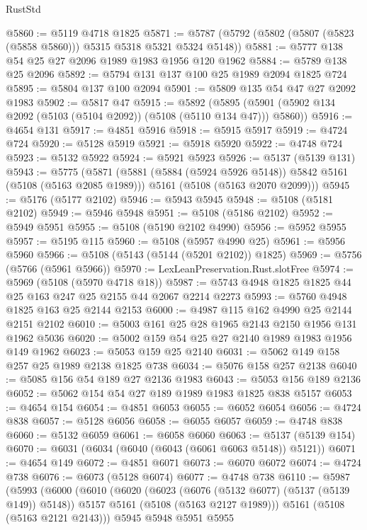 \begin{lexlean}{RustStd}
\begin{coremodule}
@5860 := @5119 @4718 @1825
@5871 := @5787 (@5792 (@5802 (@5807 (@5823 (@5858 @5860))) @5315 @5318 @5321 @5324 @5148))
@5881 := @5777 @138 @54 @25 @27 @2096 @1989 @1983 @1956 @120 @1962
@5884 := @5789 @138 @25 @2096
@5892 := @5794 @131 @137 @100 @25 @1989 @2094 @1825 @724
@5895 := @5804 @137 @100 @2094
@5901 := @5809 @135 @54 @47 @27 @2092 @1983
@5902 := @5817 @47
@5915 := @5892
    (@5895 (@5901 (@5902 @134 @2092 (@5103 (@5104 @2092)) (@5108 (@5110 @134 @47))) @5860))
@5916 := @4654 @131
@5917 := @4851 @5916
@5918 := @5915 @5917
@5919 := @4724 @724
@5920 := @5128 @5919
@5921 := @5918 @5920
@5922 := @4748 @724
@5923 := @5132 @5922
@5924 := @5921 @5923
@5926 := @5137 (@5139 @131)
@5943 := @5775
    (@5871
      (@5881 (@5884 (@5924 @5926 @5148)) @5842 @5161 (@5108 (@5163 @2085 @1989)))
      @5161
      (@5108 (@5163 @2070 @2099)))
@5945 := @5176 (@5177 @2102)
@5946 := @5943 @5945
@5948 := @5108 (@5181 @2102)
@5949 := @5946 @5948
@5951 := @5108 (@5186 @2102)
@5952 := @5949 @5951
@5955 := @5108 (@5190 @2102 @4990)
@5956 := @5952 @5955
@5957 := @5195 @115
@5960 := @5108 (@5957 @4990 @25)
@5961 := @5956 @5960
@5966 := @5108 (@5143 (@5144 (@5201 @2102)) @1825)
@5969 := @5756 (@5766 (@5961 @5966))
@5970 := LexLeanPreservation.Rust.slotFree
@5974 := @5969 (@5108 (@5970 @4718 @18))
@5987 := @5743 @4948 @1825 @1825 @44 @25 @163 @247 @25 @2155 @44 @2067 @2214 @2273
@5993 := @5760 @4948 @1825 @163 @25 @2144 @2153
@6000 := @4987 @115 @162 @4990 @25 @2144 @2151 @2102
@6010 := @5003 @161 @25 @28 @1965 @2143 @2150 @1956 @131 @1962 @5036
@6020 := @5002 @159 @54 @25 @27 @2140 @1989 @1983 @1956 @149 @1962
@6023 := @5053 @159 @25 @2140
@6031 := @5062 @149 @158 @257 @25 @1989 @2138 @1825 @738
@6034 := @5076 @158 @257 @2138
@6040 := @5085 @156 @54 @189 @27 @2136 @1983
@6043 := @5053 @156 @189 @2136
@6052 := @5062 @154 @54 @27 @189 @1989 @1983 @1825 @838 @5157
@6053 := @4654 @154
@6054 := @4851 @6053
@6055 := @6052 @6054
@6056 := @4724 @838
@6057 := @5128 @6056
@6058 := @6055 @6057
@6059 := @4748 @838
@6060 := @5132 @6059
@6061 := @6058 @6060
@6063 := @5137 (@5139 @154)
@6070 := @6031 (@6034 (@6040 (@6043 (@6061 @6063 @5148)) @5121))
@6071 := @4654 @149
@6072 := @4851 @6071
@6073 := @6070 @6072
@6074 := @4724 @738
@6076 := @6073 (@5128 @6074)
@6077 := @4748 @738
@6110 := @5987
    (@5993
      (@6000
        (@6010
          (@6020
            (@6023 (@6076 (@5132 @6077) (@5137 (@5139 @149)) @5148))
            @5157
            @5161
            (@5108 (@5163 @2127 @1989)))
          @5161
          (@5108 (@5163 @2121 @2143)))
        @5945
        @5948
        @5951
        @5955

\end{coremodule}
\end{lexlean}
